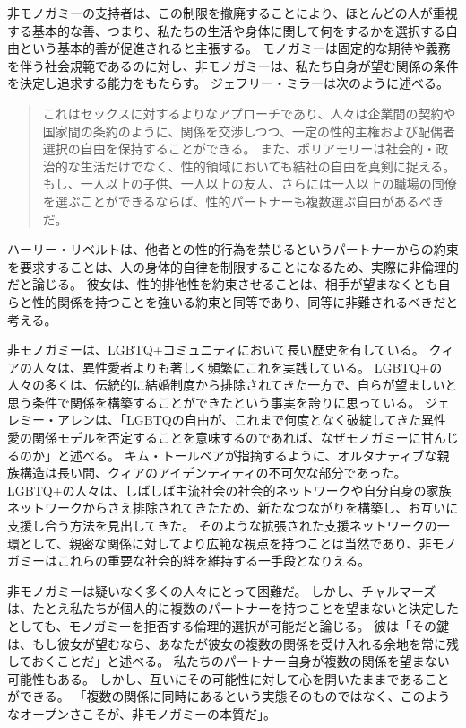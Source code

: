 \documentclass[paper=a4,book,openany]{jlreq} \usepackage{mystyle}
\begin{document}
非モノガミーの支持者は、この制限を撤廃することにより、ほとんどの人が重視する基本的な善、つまり、私たちの生活や身体に関して何をするかを選択する自由という基本的善が促進されると主張する。
モノガミーは固定的な期待や義務を伴う社会規範であるのに対し、非モノガミーは、私たち自身が望む関係の条件を決定し追求する能力をもたらす。
ジェフリー・ミラーは次のように述べる。

\begin{quote}
これはセックスに対するよりなアプローチであり、人々は企業間の契約や国家間の条約のように、関係を交渉しつつ、一定の性的主権および配偶者選択の自由を保持することができる。
また、ポリアモリーは社会的・政治的な生活だけでなく、性的領域においても結社の自由を真剣に捉える。
もし、一人以上の子供、一人以上の友人、さらには一人以上の職場の同僚を選ぶことができるならば、性的パートナーも複数選ぶ自由があるべきだ。
\citep{miller19:_polyam_is_growin}

\end{quote}

ハーリー・リベルトは、他者との性的行為を禁じるというパートナーからの約束を要求することは、人の身体的自律を制限することになるため、実際に非倫理的だと論じる。
彼女は、性的排他性を約束させることは、相手が望まなくとも自らと性的関係を持つことを強いる約束と同等であり、同等に非難されるべきだと考える\citep{liberto17:_prob_sexual_prom}。

非モノガミーは、LGBTQ+コミュニティにおいて長い歴史を有している。
クィアの人々は、異性愛者よりも著しく頻繁にこれを実践している\citep{haupert17:_preval_exper_consen_nonmon_relat}。
LGBTQ+の人々の多くは、伝統的に結婚制度から排除されてきた一方で、自らが望ましいと思う条件で関係を構築することができたという事実を誇りに思っている。
ジェレミー・アレンは、「LGBTQの自由が、これまで何度となく破綻してきた異性愛の関係モデルを否定することを意味するのであれば、なぜモノガミーに甘んじるのか」と述べる\citep{allen20:_his_body_doesn_belon_me}。
キム・トールベアが指摘するように、オルタナティブな親族構造は長い間、クィアのアイデンティティの不可欠な部分であった。
LGBTQ+の人々は、しばしば主流社会の社会的ネットワークや自分自身の家族ネットワークからさえ排除されてきたため、新たなつながりを構築し、お互いに支援し合う方法を見出してきた。
そのような拡張された支援ネットワークの一環として、親密な関係に対してより広範な視点を持つことは当然であり、非モノガミーはこれらの重要な社会的絆を維持する一手段となりえる\citep{podcast18:_episod}。

非モノガミーは疑いなく多くの人々にとって困難だ。
しかし、チャルマーズは、たとえ私たちが個人的に複数のパートナーを持つことを望まないと決定したとしても、モノガミーを拒否する倫理的選択が可能だと論じる。
彼は「その鍵は、もし彼女が望むなら、あなたが彼女の複数の関係を受け入れる余地を常に残しておくことだ」と述べる\citep[p.241]{chalmers19:_is_monog_moral_permis}。
私たちのパートナー自身が複数の関係を望まない可能性もある。
しかし、互いにその可能性に対して心を開いたままであることができる。
「複数の関係に同時にあるという実態そのものではなく、このようなオープンさこそが、非モノガミーの本質だ」\citep[p.241]{chalmers19:_is_monog_moral_permis}。
\end{document}
